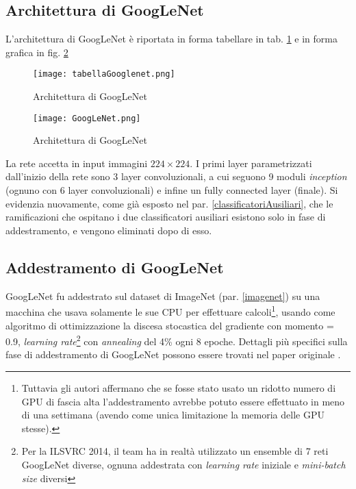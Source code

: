 \subsection{Architettura di GoogLeNet}
\label{architetturaGooglenet}
L'architettura di GoogLeNet è riportata in forma tabellare in tab. \ref{tab:tabellaGooglenet} e in forma grafica in fig. \ref{fig:googlenet}

\begin{figure}[h]
\centering
\texttt{[image: tabellaGooglenet.png]}
\caption{Architettura di GoogLeNet}
\label{tab:tabellaGooglenet}
\end{figure}

\begin{figure}[tb] 
\centering
\texttt{[image: GoogLeNet.png]}
\caption{Architettura di GoogLeNet}
\label{fig:googlenet}
\end{figure}

La rete accetta in input immagini $224\times 224$. I primi layer parametrizzati dall'inizio della rete sono 3 layer convoluzionali, a cui seguono 9 moduli \textit{inception} (ognuno con 6 layer convoluzionali) e infine un fully connected layer (finale).
Si evidenzia nuovamente, come già esposto nel par. \ref{classificatoriAusiliari}, che le ramificazioni che ospitano i due classificatori ausiliari esistono solo in fase di addestramento, e vengono eliminati dopo di esso.

\subsection{Addestramento di GoogLeNet}
GoogLeNet fu addestrato sul dataset di ImageNet (par. \ref{imagenet}) su una macchina che usava solamente le sue CPU per effettuare calcoli\footnote{Tuttavia gli autori affermano che se fosse stato usato un ridotto numero di GPU di fascia alta l'addestramento avrebbe potuto essere effettuato in meno di una settimana (avendo come unica limitazione la memoria delle GPU stesse).}, usando come algoritmo di ottimizzazione la discesa stocastica del gradiente con momento = 0.9, \textit{learning rate}\footnote{Per la ILSVRC 2014, il team ha in realtà utilizzato un ensemble di 7 reti GoogLeNet diverse, ognuna addestrata con \textit{learning rate} iniziale e \textit{mini-batch size} diversi} con \textit{annealing} del 4\% ogni 8 epoche. Dettagli più specifici sulla fase di addestramento di GoogLeNet possono essere trovati nel paper originale \cite{googlenet}.